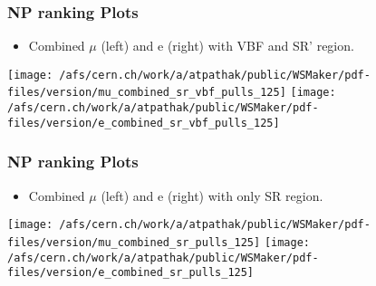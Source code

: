 \documentclass{beamer}
\begin{document}
\begin{frame}
\begin{table}
{{\begin{tabular}{| l | c | c | c | c | c | c | c | c | c |}
\hline
\end{tabular}
}}
\end{table}
%
\end{frame}
\begin{frame}
\frametitle{NP ranking Plots}
\begin{normalsize}
\begin{center}
\begin {itemize}
\item Combined $\mu$ (left) and e (right) with VBF and SR' region.
\end {itemize}
\texttt{[image: /afs/cern.ch/work/a/atpathak/public/WSMaker/pdf-files/version/mu\_combined\_sr\_vbf\_pulls\_125]}
\texttt{[image: /afs/cern.ch/work/a/atpathak/public/WSMaker/pdf-files/version/e\_combined\_sr\_vbf\_pulls\_125]}
\end{center}
\end{normalsize}
\end{frame}
\begin{frame}
\frametitle{NP ranking Plots}
\begin{normalsize}
\begin{center}
\begin {itemize}
\item Combined $\mu$ (left) and e (right) with only SR region.
\end {itemize}
\texttt{[image: /afs/cern.ch/work/a/atpathak/public/WSMaker/pdf-files/version/mu\_combined\_sr\_pulls\_125]}
\texttt{[image: /afs/cern.ch/work/a/atpathak/public/WSMaker/pdf-files/version/e\_combined\_sr\_pulls\_125]}
\end{center}
\end{normalsize}
\end{frame}
\end{document}
